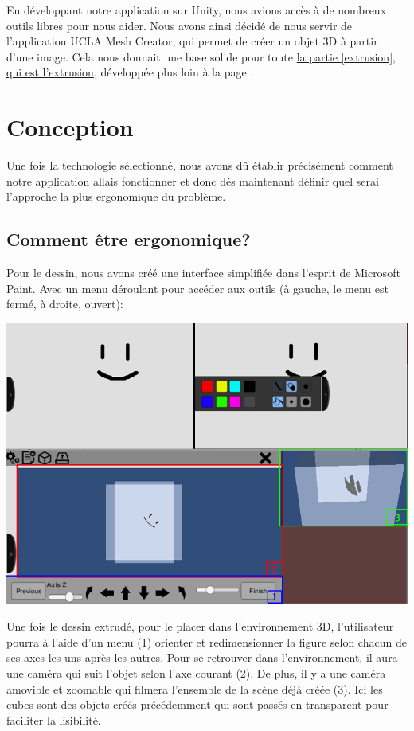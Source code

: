 \documentclass[a4paper,11pt]{article}
\begin{document}
		En développant notre application sur Unity\cite{Unity}, nous avions accès à de nombreux outils libres pour nous aider. Nous avons ainsi décidé de nous servir de l'application UCLA Mesh Creator\cite{UCLA}, qui permet de créer un objet 3D à partir d'une image. Cela nous donnait une base solide pour toute \hyperlink{ancre}{la partie \ref{extrusion}, qui est l'extrusion}, développée plus loin à la page \pageref{extrusion}. 
		
	
		
	\section{Conception}
	
		Une fois la technologie sélectionné, nous avons dû établir précisément comment notre application allais fonctionner et donc dés maintenant définir quel serai l'approche la plus ergonomique du problème.
		
		\subsection{Comment être ergonomique?} %
		Pour le dessin, nous avons créé une interface simplifiée dans l'esprit de Microsoft Paint. Avec un menu déroulant pour accéder aux outils (à gauche, le menu est fermé, à droite, ouvert):
		\centerline{\includegraphics[scale=0.5]{images/Cmt_placer.png}}
		
		Une fois le dessin extrudé, pour le placer dans l'environnement 3D, l'utilisateur pourra à l'aide d'un menu (1) orienter et redimensionner la figure selon chacun de ses axes les uns après les autres. Pour se retrouver dans l'environnement, il aura une caméra qui suit l'objet selon l'axe courant (2). De plus, il y a une caméra amovible et zoomable qui filmera l'ensemble de la scène déjà créée (3). Ici les cubes sont des objets créés précédemment qui sont passés en transparent pour faciliter la lisibilité.
		\newline
		
\end{document}
